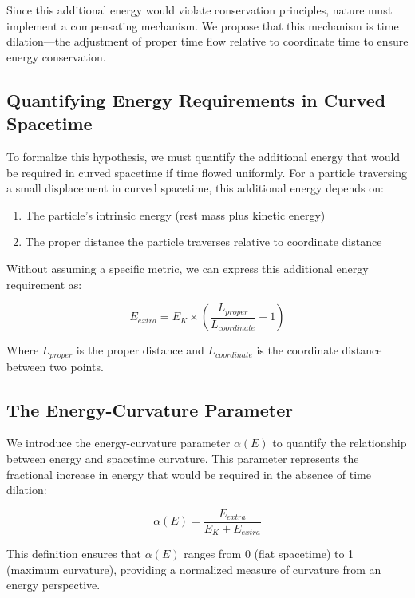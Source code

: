 \documentclass[11pt,a4paper]{article}
\begin{document}
Since this additional energy would violate conservation principles, nature must implement a compensating mechanism. We propose that this mechanism is time dilation—the adjustment of proper time flow relative to coordinate time to ensure energy conservation.

\subsection{Quantifying Energy Requirements in Curved Spacetime}
To formalize this hypothesis, we must quantify the additional energy that would be required in curved spacetime if time flowed uniformly. For a particle traversing a small displacement in curved spacetime, this additional energy depends on:

\begin{enumerate}
    \item The particle's intrinsic energy (rest mass plus kinetic energy)
    \item The proper distance the particle traverses relative to coordinate distance
\end{enumerate}

Without assuming a specific metric, we can express this additional energy requirement as:

\begin{equation}
    E_{extra} = E_K \times \left(\frac{L_{proper}}{L_{coordinate}} - 1\right)
\end{equation}

Where $L_{proper}$ is the proper distance and $L_{coordinate}$ is the coordinate distance between two points.

\subsection{The Energy-Curvature Parameter}
We introduce the energy-curvature parameter $\alpha(E)$ to quantify the relationship between energy and spacetime curvature. This parameter represents the fractional increase in energy that would be required in the absence of time dilation:

\begin{equation}
    \alpha(E) = \frac{E_{extra}}{E_K + E_{extra}}
\end{equation}

This definition ensures that $\alpha(E)$ ranges from 0 (flat spacetime) to 1 (maximum curvature), providing a normalized measure of curvature from an energy perspective.
\end{document}
